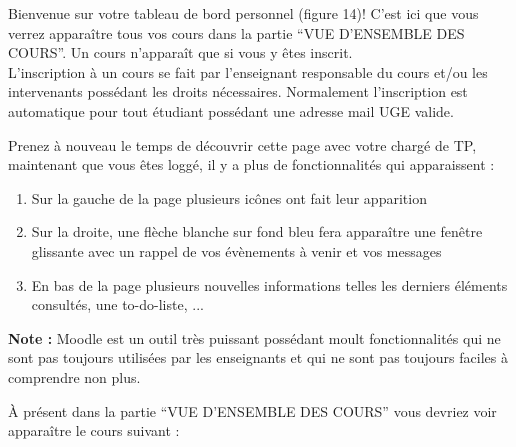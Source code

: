 \documentclass{article}
\begin{document}
\begin{exercice}
Bienvenue sur votre tableau de bord personnel (figure 14)! C'est ici que vous verrez apparaître tous vos cours dans la partie ``VUE D'ENSEMBLE DES COURS''.
Un cours n'apparaît que si vous y êtes inscrit.\\
L'inscription à un cours se fait par l'enseignant responsable du cours et/ou les intervenants possédant les droits nécessaires.
Normalement l'inscription est automatique pour tout étudiant possédant une adresse mail UGE valide.

\newpage

Prenez à nouveau le temps de découvrir cette page avec votre chargé de TP, maintenant que vous êtes loggé, il y a plus de fonctionnalités qui apparaissent :

\begin{enumerate}
\item Sur la gauche de la page plusieurs icônes ont fait leur apparition
\item Sur la droite, une flèche blanche sur fond bleu fera apparaître une fenêtre glissante avec un rappel de vos évènements à venir et vos messages
\item En bas de la page plusieurs nouvelles informations telles les derniers éléments consultés, une to-do-liste, ... 
\end{enumerate}

\textbf{Note :} Moodle est un outil très puissant possédant moult fonctionnalités qui ne sont pas toujours utilisées par les enseignants et qui ne sont pas toujours faciles à comprendre non plus.

\medskip

À présent dans la partie ``VUE D'ENSEMBLE DES COURS'' vous devriez voir apparaître le cours suivant : 


\end{exercice}
\end{document}
